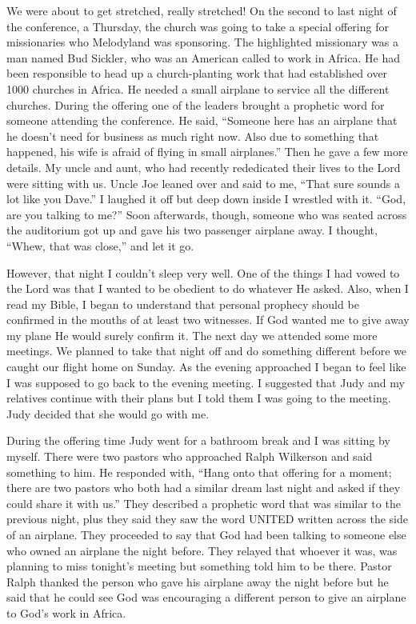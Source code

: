 \documentclass[oneside]{book}
\begin{document}
We were about to get stretched, really stretched! On the second to last night of the conference, a Thursday, the church was going to take a special offering for missionaries who Melodyland was sponsoring. The highlighted missionary was a man named Bud Sickler, who was an American called to work in Africa. He had been responsible to head up a church-planting work that had established over 1000 churches in Africa. He needed a small airplane to service all the different churches. During the offering one of the leaders brought a prophetic word for someone attending the conference. He said, “Someone here has an airplane that he doesn't need for business as much right now. Also due to something that happened, his wife is afraid of flying in small airplanes.” Then he gave a few more details. My uncle and aunt, who had recently rededicated their lives to the Lord were sitting with us. Uncle Joe leaned over and said to me, “That sure sounds a lot like you Dave.” I laughed it off but deep down inside I wrestled with it. “God, are you talking to me?” Soon afterwards, though, someone who was seated across the auditorium got up and gave his two passenger airplane away. I thought, “Whew, that was close,” and let it go.

However, that night I couldn't sleep very well. One of the things I had vowed to the Lord was that I wanted to be obedient to do whatever He asked. Also, when I read my Bible, I began to understand that personal prophecy should be confirmed in the mouths of at least two witnesses. If God wanted me to give away my plane He would surely confirm it. The next day we attended some more meetings. We planned to take that night off and do something different before we caught our flight home on Sunday. As the evening approached I began to feel like I was supposed to go back to the evening meeting. I suggested that Judy and my relatives continue with their plans but I told them I was going to the meeting. Judy decided that she would go with me. 

During the offering time Judy went for a bathroom break and I was sitting by myself. There were two pastors who approached Ralph Wilkerson and said something to him. He responded with, “Hang onto that offering for a moment; there are two pastors who both had a similar dream last night and asked if they could share it with us.” They described a prophetic word that was similar to the previous night, plus they said they saw the word UNITED written across the side of an airplane. They proceeded to say that God had been talking to someone else who owned an airplane the night before. They relayed that whoever it was, was planning to miss tonight’s meeting but something told him to be there. Pastor Ralph thanked the person who gave his airplane away the night before but he said that he could see God was encouraging a different person to give an airplane to God’s work in Africa. 
\end{document}
